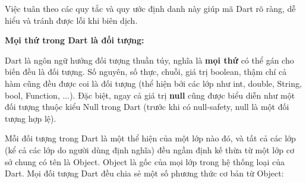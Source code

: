 \documentclass[../DoAn.tex]{subfiles}
\numberwithin{figure}{chapter}
\begin{document}
Việc tuân theo các quy tắc và quy ước định danh này giúp mã Dart rõ ràng, dễ hiểu và tránh được lỗi khi biên dịch. 

\textbf{Mọi thứ trong Dart là đối tượng:} 

Dart là ngôn ngữ hướng đối tượng thuần túy, nghĩa là \textbf{mọi thứ} có thể gán cho biến đều là đối tượng. Số nguyên, số thực, chuỗi, giá trị boolean, thậm chí cả hàm cũng đều được coi là đối tượng (thể hiện bởi các lớp như int, double, String, bool, Function, ...). Đặc biệt, ngay cả giá trị \textbf{null} cũng được biểu diễn như một đối tượng thuộc kiểu Null trong Dart (trước khi có null-safety, null là một đối tượng hợp lệ). 

Mỗi đối tượng trong Dart là một thể hiện của một lớp nào đó, và tất cả các lớp (kể cả các lớp do người dùng định nghĩa) đều ngầm định kế thừa từ một lớp cơ sở chung có tên là Object. Object là gốc của mọi lớp trong hệ thống loại của Dart. Mọi đối tượng Dart đều chia sẻ một số phương thức cơ bản từ Object:
\end{document}
